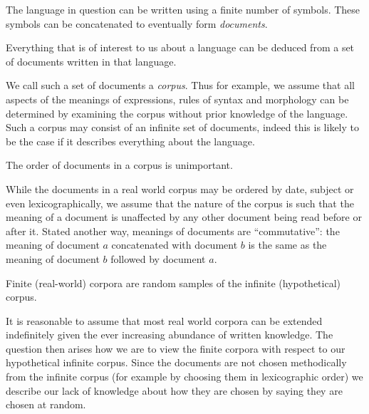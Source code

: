 \documentclass[12pt]{report}
\begin{document}
\begin{assumption}The language in question can be written using a finite number of symbols. These symbols can be concatenated to eventually form \emph{documents}.\end{assumption}
\begin{assumption}Everything that is of interest to us about a language can be deduced from a set of documents written in that language.\end{assumption} \noindent
We call such a set of documents a \emph{corpus}. Thus for example, we assume that all aspects of the meanings of expressions, rules of syntax and morphology can be determined by examining the corpus without prior knowledge of the language. Such a corpus may consist of an infinite set of documents, indeed this is likely to be the case if it describes everything about the language.
\begin{assumption} The order of documents in a corpus is unimportant.\end{assumption} \noindent
While the documents in a real world corpus may be ordered by date, subject or even lexicographically, we assume that the nature of the corpus is such that the meaning of a document is unaffected by any other document being read before or after it. Stated another way, meanings of documents are ``commutative'': the meaning of document $a$ concatenated with document $b$ is the same as the meaning of document $b$ followed by document $a$.
\begin{assumption}Finite (real-world) corpora are random samples of the infinite (hypothetical) corpus.\end{assumption} \noindent
 It is reasonable to assume that most real world corpora can be extended indefinitely given the ever increasing abundance of written knowledge. The question then arises how we are to view the finite corpora with respect to our hypothetical infinite corpus. Since the documents are not chosen methodically from the infinite corpus (for example by choosing them in lexicographic order) we describe our lack of knowledge about how they are chosen by saying they are chosen at random.
\end{document}
